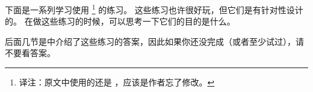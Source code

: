下面是一系列学习使用  \footnote{译注：原文中使用的还是  ，应该是作者忘了修改。} 的练习。
这些练习也许很好玩，但它们是有针对性设计的。
在做这些练习的时候，可以思考一下它们的目的是什么。


后面几节是中介绍了这些练习的答案，因此如果你还没完成（或者至少试过），请不要看答案。



